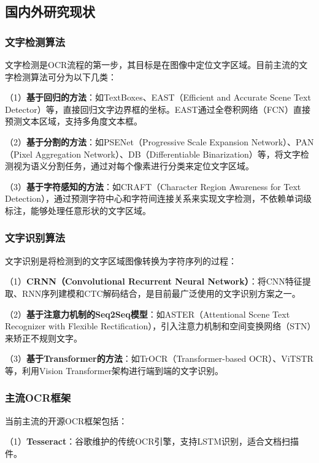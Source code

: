 \documentclass[12pt,hyperref,a4paper,UTF8]{ctexart}
\begin{document}
\subsection{国内外研究现状}

\subsubsection{文字检测算法}

文字检测是OCR流程的第一步，其目标是在图像中定位文字区域。目前主流的文字检测算法可分为以下几类：

（1）\textbf{基于回归的方法}：如TextBoxes、EAST（Efficient and Accurate Scene Text Detector）等，直接回归文字边界框的坐标。EAST通过全卷积网络（FCN）直接预测文本区域，支持多角度文本框。

（2）\textbf{基于分割的方法}：如PSENet（Progressive Scale Expansion Network）、PAN（Pixel Aggregation Network）、DB（Differentiable Binarization）等，将文字检测视为语义分割任务，通过对每个像素进行分类来定位文字区域。

（3）\textbf{基于字符感知的方法}：如CRAFT（Character Region Awareness for Text Detection），通过预测字符中心和字符间连接关系来实现文字检测，不依赖单词级标注，能够处理任意形状的文字区域。

\subsubsection{文字识别算法}

文字识别是将检测到的文字区域图像转换为字符序列的过程：

（1）\textbf{CRNN（Convolutional Recurrent Neural Network）}：将CNN特征提取、RNN序列建模和CTC解码结合，是目前最广泛使用的文字识别方案之一。

（2）\textbf{基于注意力机制的Seq2Seq模型}：如ASTER（Attentional Scene Text Recognizer with Flexible Rectification），引入注意力机制和空间变换网络（STN）来矫正不规则文字。

（3）\textbf{基于Transformer的方法}：如TrOCR（Transformer-based OCR）、ViTSTR等，利用Vision Transformer架构进行端到端的文字识别。

\subsubsection{主流OCR框架}

当前主流的开源OCR框架包括：

（1）\textbf{Tesseract}：谷歌维护的传统OCR引擎，支持LSTM识别，适合文档扫描件。
\end{document}
